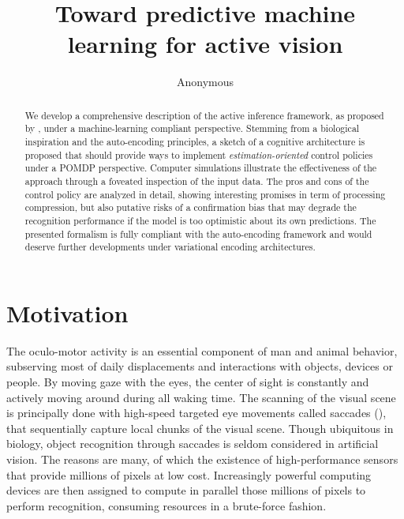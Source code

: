\documentclass{article} %
\title{Toward predictive machine learning for active vision}
\author{Anonymous
}
\begin{document}
\maketitle

\begin{abstract}
We develop a comprehensive description of the active inference framework, as proposed by \cite{friston2010free}, under a machine-learning compliant perspective. Stemming from a biological inspiration and the auto-encoding principles, a sketch of a cognitive architecture is proposed that should provide ways to implement \emph{estimation-oriented} control policies under a POMDP perspective. 
Computer simulations illustrate the effectiveness of the approach through a foveated inspection of the input data.
The pros and cons of the control policy are analyzed in detail, showing interesting promises in term of processing compression, but also putative risks of a confirmation bias that may degrade the recognition performance if the model is too optimistic about its own predictions. The presented formalism is fully compliant with the auto-encoding framework and would deserve further developments under variational encoding architectures.
\end{abstract}

\section{Motivation}

	The oculo-motor activity is an essential component of man and animal behavior, subserving most of daily displacements and interactions with objects, devices or people. By moving gaze with the eyes, the center of sight is constantly and actively moving around during all waking time.  %
	The scanning of the visual scene is principally done with high-speed targeted eye movements called saccades (\cite{yarbus1967eye}), that sequentially capture local chunks of the visual scene. 
	Though ubiquitous in biology, object recognition through saccades is seldom considered in artificial vision. The reasons are many, of which the existence of high-performance sensors that provide millions of pixels at low cost. %
	Increasingly powerful computing devices are then assigned to compute in parallel those millions of pixels to perform recognition, consuming resources in a brute-force fashion. 
	
\end{document}
